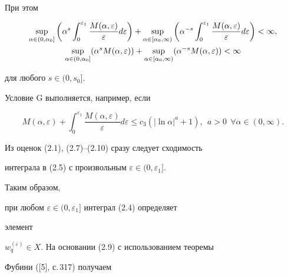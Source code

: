 При этом


\begin{gather}


\sup_{\alpha\in(0,\alpha_0]}\bigg(\alpha^s


\int^{\varepsilon_1}_0 \frac{M(\alpha,\varepsilon)}{\varepsilon}


d\varepsilon\bigg)+\sup_{\alpha\in[\alpha_0,\infty)}\bigg(


\alpha^{-s}\int^{\varepsilon_1}_0


\frac{M(\alpha,\varepsilon)}{\varepsilon}d\varepsilon\bigg)<\infty, \\


%


\sup_{\alpha\in(0,\alpha_0]}(\alpha^s M(\alpha,\varepsilon))+


\sup_{\alpha\in[\alpha_0,\infty)}(\alpha^{-s}M(\alpha,\varepsilon))


<\infty \notag


\end{gather}


для любого $s\in(0,s_0]$.





\begin{note}


Условие G выполняется, например, если


$$


M(\alpha,\varepsilon)+\int^{\varepsilon_1}_0


\frac{M(\alpha,\varepsilon)}{\varepsilon}d\varepsilon\le


c_3(|\ln \alpha|^a+1),\ \ a>0 \ \ \forall\alpha\in(0,\infty).


$$


\end{note}





Из оценок (2.1), (2.7)--(2.10) сразу следует сходимость 


интеграла в (2.5) с произвольным $\varepsilon\in(0,\varepsilon_1]$. 


Таким образом,


при любом $\varepsilon\in(0,\varepsilon_1]$ интеграл (2.4) определяет 


элемент


$w^{(\varepsilon)}_q\in X$. На основании (2.9) с использованием теоремы 


Фубини ([5], с.\,317) получаем


